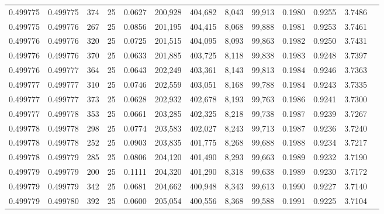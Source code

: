 \begin{tabular}{rrrrrrrrrrrrr}
0.499775 & 0.499775 &   374 &  25 &                                     0.0627 & 200,928 & 404,682 &   8,043 &  99,913 & 0.1980 & 0.9255 & 3.7486 \\
0.499775 & 0.499776 &   267 &  25 &                                     0.0856 & 201,195 & 404,415 &   8,068 &  99,888 & 0.1981 & 0.9253 & 3.7461 \\
0.499776 & 0.499776 &   320 &  25 &                                     0.0725 & 201,515 & 404,095 &   8,093 &  99,863 & 0.1982 & 0.9250 & 3.7431 \\
0.499776 & 0.499776 &   370 &  25 &                                     0.0633 & 201,885 & 403,725 &   8,118 &  99,838 & 0.1983 & 0.9248 & 3.7397 \\
0.499776 & 0.499777 &   364 &  25 &                                     0.0643 & 202,249 & 403,361 &   8,143 &  99,813 & 0.1984 & 0.9246 & 3.7363 \\
0.499777 & 0.499777 &   310 &  25 &                                     0.0746 & 202,559 & 403,051 &   8,168 &  99,788 & 0.1984 & 0.9243 & 3.7335 \\
0.499777 & 0.499777 &   373 &  25 &                                     0.0628 & 202,932 & 402,678 &   8,193 &  99,763 & 0.1986 & 0.9241 & 3.7300 \\
0.499777 & 0.499778 &   353 &  25 &                                     0.0661 & 203,285 & 402,325 &   8,218 &  99,738 & 0.1987 & 0.9239 & 3.7267 \\
0.499778 & 0.499778 &   298 &  25 &                                     0.0774 & 203,583 & 402,027 &   8,243 &  99,713 & 0.1987 & 0.9236 & 3.7240 \\
0.499778 & 0.499778 &   252 &  25 &                                     0.0903 & 203,835 & 401,775 &   8,268 &  99,688 & 0.1988 & 0.9234 & 3.7217 \\
0.499778 & 0.499779 &   285 &  25 &                                     0.0806 & 204,120 & 401,490 &   8,293 &  99,663 & 0.1989 & 0.9232 & 3.7190 \\
0.499779 & 0.499779 &   200 &  25 &                                     0.1111 & 204,320 & 401,290 &   8,318 &  99,638 & 0.1989 & 0.9230 & 3.7172 \\
0.499779 & 0.499779 &   342 &  25 &                                     0.0681 & 204,662 & 400,948 &   8,343 &  99,613 & 0.1990 & 0.9227 & 3.7140 \\
0.499779 & 0.499780 &   392 &  25 &                                     0.0600 & 205,054 & 400,556 &   8,368 &  99,588 & 0.1991 & 0.9225 & 3.7104 \\

\end{tabular}
